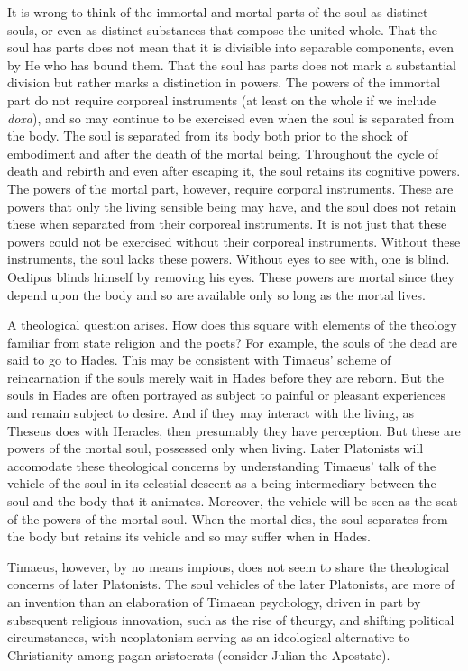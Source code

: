 It is wrong to think of the immortal and mortal parts of the soul as distinct souls, or even as distinct substances that compose the united whole. That the soul has parts does not mean that it is divisible into separable components, even by He who has bound them. That the soul has parts does not mark a substantial division but rather marks a distinction in powers. The powers of the immortal part do not require corporeal instruments (at least on the whole if we include \emph{doxa}), and so may continue to be exercised even when the soul is separated from the body. The soul is separated from its body both prior to the shock of embodiment and after the death of the mortal being. Throughout the cycle of death and rebirth and even after escaping it, the soul retains its cognitive powers. The powers of the mortal part, however, require corporal instruments. These are powers that only the living sensible being may have, and the soul does not retain these when separated from their corporeal instruments. It is not just that these powers could not be exercised without their corporeal instruments. Without these instruments, the soul lacks these powers. Without eyes to see with, one is blind. Oedipus blinds himself by removing his eyes. These powers are mortal since they depend upon the body and so are available only so long as the mortal lives.

A theological question arises. How does this square with elements of the theology familiar from state religion and the poets? For example, the souls of the dead are said to go to Hades. This may be consistent with Timaeus' scheme of reincarnation if the souls merely wait in Hades before they are reborn. But the souls in Hades are often portrayed as subject to painful or pleasant experiences and remain subject to desire. And if they may interact with the living, as Theseus does with Heracles, then presumably they have perception. But these are powers of the mortal soul, possessed only when living. Later Platonists will accomodate these theological concerns by understanding Timaeus' talk of the vehicle of the soul in its celestial descent as a being intermediary between the soul and the body that it animates. Moreover, the vehicle will be seen as the seat of the powers of the mortal soul. When the mortal dies, the soul separates from the body but retains its vehicle and so may suffer when in Hades.

Timaeus, however, by no means impious, does not seem to share the theological concerns of later Platonists. The soul vehicles of the later Platonists, are more of an invention than an elaboration of Timaean psychology, driven in part by subsequent religious innovation, such as the rise of theurgy, and shifting political circumstances, with neoplatonism serving as an ideological alternative to Christianity among pagan aristocrats (consider Julian the Apostate).

